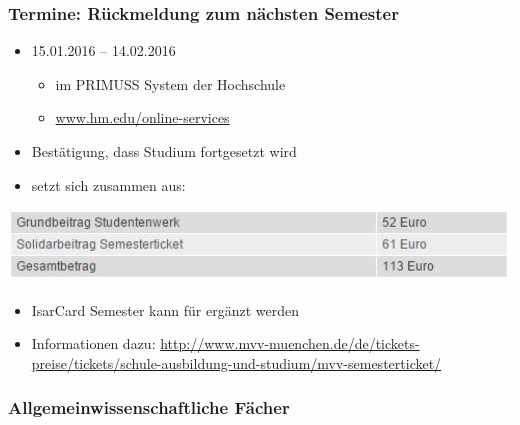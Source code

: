 \documentclass{beamer}
\begin{document}
    \begin{frame}
    	\frametitle{Termine: Rückmeldung zum nächsten Semester}
    	\begin{itemize}
    		\item 15.01.2016 – 14.02.2016
    		\begin{itemize}
    			\item im PRIMUSS System der Hochschule
    			\item \url{www.hm.edu/online-services}
    		\end{itemize}
    		\pause
    		\item Bestätigung, dass Studium fortgesetzt wird
    		\pause
    		\item setzt sich zusammen aus:
    	\end{itemize}
    	\includegraphics[width=1\textwidth]{rueckmeldung.jpg}
    	\pause
    	\begin{itemize}
    		\item IsarCard Semester kann für  ergänzt werden
    		\item Informationen dazu: \footnotesize{\url{http://www.mvv-muenchen.de/de/tickets-preise/tickets/schule-ausbildung-und-studium/mvv-semesterticket/}}
    	\end{itemize}
    \end{frame}
    
     \begin{frame}
         \frametitle{Allgemeinwissenschaftliche Fächer}
         
     \end{frame}
    
    
    
\end{document}
